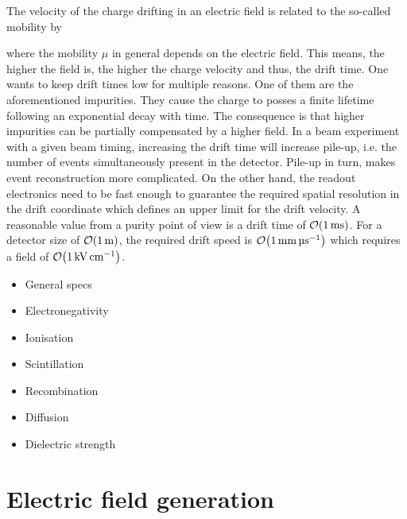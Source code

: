 The velocity of the charge drifting in an electric field is related to the so-called mobility by


where the mobility $\mu$ in general depends on the electric field.
This means, the higher the field is, the higher the charge velocity and thus, the drift time.
One wants to keep drift times low for multiple reasons.
One of them are the aforementioned impurities.
They cause the charge to posses a finite lifetime following an exponential decay with time.
The consequence is that higher impurities can be partially compensated by a higher field.
In a beam experiment with a given beam timing, increasing the drift time will increase pile-up, i.e. the number of events simultaneously present in the detector.
Pile-up in turn, makes event reconstruction more complicated.
On the other hand, the readout electronics need to be fast enough to guarantee the required spatial resolution in the drift coordinate which defines an upper limit for the drift velocity.
A reasonable value from a purity point of view is a drift time of $\order{\SI{1}{\milli\second}}$.
For a detector size of $\order{\SI{1}{\metre}}$, the required drift speed is $\order{\SI{1}{\milli\metre\per\micro\second}}$ which requires a field of $\order{\SI{1}{\kilo\volt\per\centi\metre}}$.


\begin{itemize}
	\item General specs
	\item Electronegativity
	\item Ionisation
	\item Scintillation
	\item Recombination
	\item Diffusion
	\item Dielectric strength
\end{itemize}
\cite{NobleGasDetectors}


\section{Electric field generation\label{sec:lartpc_efield}}

